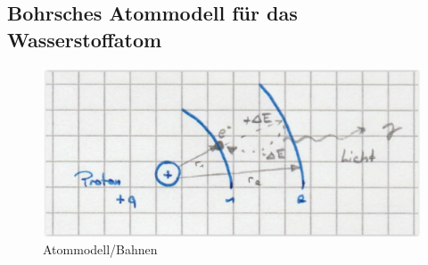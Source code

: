 \documentclass[12pt,a4paper]{report}%
\numberwithin{equation}{section}
\numberwithin{equation}{subsection}
\begin{document}
		\subsection{Bohrsches Atommodell für das Wasserstoffatom}
		\begin{figure}[H] 
		  \centering
		  \captionsetup{justification=centering}
		  \includegraphics[width=0.6\linewidth]{atommodell_photon.png}
		  \caption{Atommodell/Bahnen \protect\cite{atom_photon}}
		  \label{fig:atommodell_photon}
		\end{figure}
\end{document}
